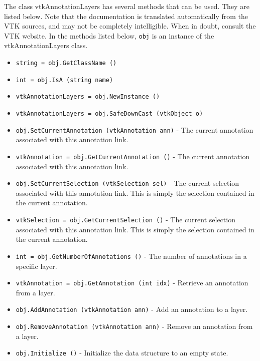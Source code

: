 The class vtkAnnotationLayers has several methods that can be used.
  They are listed below.
Note that the documentation is translated automatically from the VTK sources,
and may not be completely intelligible.  When in doubt, consult the VTK website.
In the methods listed below, \verb|obj| is an instance of the vtkAnnotationLayers class.
\begin{itemize}
\item  \verb|string = obj.GetClassName ()|

\item  \verb|int = obj.IsA (string name)|

\item  \verb|vtkAnnotationLayers = obj.NewInstance ()|

\item  \verb|vtkAnnotationLayers = obj.SafeDownCast (vtkObject o)|

\item  \verb|obj.SetCurrentAnnotation (vtkAnnotation ann)| -  The current annotation associated with this annotation link.

\item  \verb|vtkAnnotation = obj.GetCurrentAnnotation ()| -  The current annotation associated with this annotation link.

\item  \verb|obj.SetCurrentSelection (vtkSelection sel)| -  The current selection associated with this annotation link.
 This is simply the selection contained in the current annotation.

\item  \verb|vtkSelection = obj.GetCurrentSelection ()| -  The current selection associated with this annotation link.
 This is simply the selection contained in the current annotation.

\item  \verb|int = obj.GetNumberOfAnnotations ()| -  The number of annotations in a specific layer.

\item  \verb|vtkAnnotation = obj.GetAnnotation (int idx)| -  Retrieve an annotation from a layer.

\item  \verb|obj.AddAnnotation (vtkAnnotation ann)| -  Add an annotation to a layer.

\item  \verb|obj.RemoveAnnotation (vtkAnnotation ann)| -  Remove an annotation from a layer.

\item  \verb|obj.Initialize ()| -  Initialize the data structure to an empty state.


\end{itemize}
